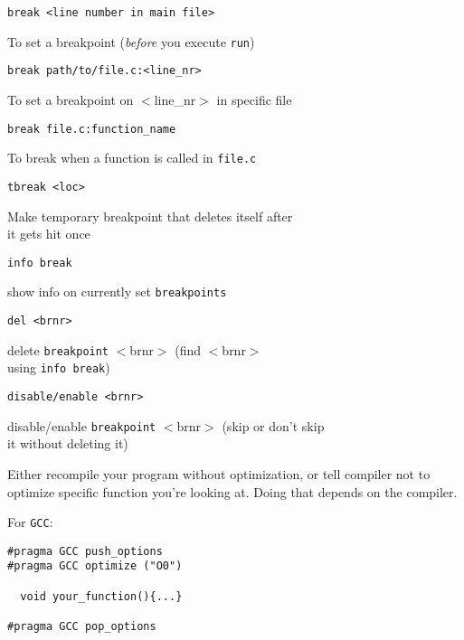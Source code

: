 \documentclass[10pt, a4paper, english, parskip, twocolumn]{scrartcl}
\newcommand{\code}[1]{\texttt{#1}}
\newcommand{\gdbsection}[1]{\begin{mdframed}[frametitlebackgroundcolor=bittersweet,style=section,
frametitle=#1]\end{mdframed}}
\begin{document}
\begin{lstlisting}[belowskip=-0.8 \baselineskip]
break <line number in main file>
\end{lstlisting}
%
\quad To set a breakpoint (\textit{before} you execute \code{run})
%
\begin{lstlisting}[belowskip=-0.8 \baselineskip]
break path/to/file.c:<line_nr>
\end{lstlisting}
\quad To set a breakpoint on $<$line\_nr$>$ in specific file
%
\begin{lstlisting}[belowskip=-0.8 \baselineskip]
break file.c:function_name
\end{lstlisting}
\quad To break when a function is called in \code{file.c}
%
\begin{lstlisting}[belowskip=-0.8 \baselineskip]
tbreak <loc>
\end{lstlisting}
\quad Make temporary breakpoint that deletes itself after \\
\quad it gets hit once
%
\begin{lstlisting}[belowskip=-0.8 \baselineskip]
info break
\end{lstlisting}
\quad show info on currently set \code{breakpoints}
%
\begin{lstlisting}[belowskip=-0.8 \baselineskip]
del <brnr>
\end{lstlisting}
\quad delete \code{breakpoint} $<$brnr$>$ (find $<$brnr$>$\\
\quad using \code{info break})
%
\begin{lstlisting}[belowskip=-0.8 \baselineskip]
disable/enable <brnr>
\end{lstlisting}
\quad disable/enable \code{breakpoint} $<$brnr$>$ (skip or don't skip \\
\quad it without deleting it)
%









\gdbsection{gdb and ``value has been optimized out''}

Either recompile your program without optimization, or tell compiler not to optimize specific
function you're looking at. Doing that depends on the compiler.


For \code{GCC}:
\begin{lstlisting}[belowskip=-0.8 \baselineskip]
#pragma GCC push_options
#pragma GCC optimize ("O0")

  void your_function(){...}

#pragma GCC pop_options
\end{lstlisting}
%
\end{document}
